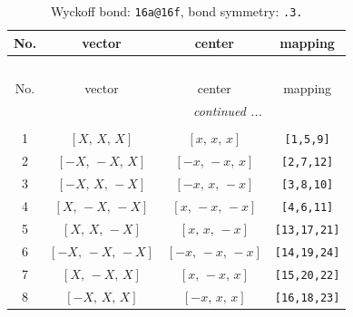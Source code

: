\documentclass[fleqn,8pt]{jsarticle}
\begin{document}
\begin{longtable}{cccc}
\caption{Wyckoff bond: {\tt 16a@16f}, bond symmetry: {\tt .3.}}
 \\
 \hline \hline
No. & vector & center & mapping \\ \hline \endfirsthead

\multicolumn{3}{l}{\tablename\ \thetable{}} \\
 \hline \hline
No. & vector & center & mapping \\ \hline \endhead

 \hline \hline
\multicolumn{3}{r}{\footnotesize\it continued ...} \\ \endfoot

 \hline \hline
\multicolumn{3}{r}{} \\ \endlastfoot

1 & $\left[ X,\, X,\, X \right]$ & $\left[ x,\, x,\, x \right]$ & {\tt [1,5,9]} \\ \hline
2 & $\left[ - X,\, - X,\, X \right]$ & $\left[ - x,\, - x,\, x \right]$ & {\tt [2,7,12]} \\ \hline
3 & $\left[ - X,\, X,\, - X \right]$ & $\left[ - x,\, x,\, - x \right]$ & {\tt [3,8,10]} \\ \hline
4 & $\left[ X,\, - X,\, - X \right]$ & $\left[ x,\, - x,\, - x \right]$ & {\tt [4,6,11]} \\ \hline
5 & $\left[ X,\, X,\, - X \right]$ & $\left[ x,\, x,\, - x \right]$ & {\tt [13,17,21]} \\ \hline
6 & $\left[ - X,\, - X,\, - X \right]$ & $\left[ - x,\, - x,\, - x \right]$ & {\tt [14,19,24]} \\ \hline
7 & $\left[ X,\, - X,\, X \right]$ & $\left[ x,\, - x,\, x \right]$ & {\tt [15,20,22]} \\ \hline
8 & $\left[ - X,\, X,\, X \right]$ & $\left[ - x,\, x,\, x \right]$ & {\tt [16,18,23]} \\
\end{longtable}
\renewcommand{\arraystretch}{1.2}
\end{document}
